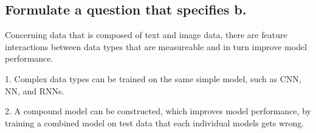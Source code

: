 \subsection{Formulate a question that specifies b.}


Concerning data that is composed of text and image data, there are feature interactions between data types that are measureable and in turn improve model performance.

1. Complex data types can be trained on the same simple model, such as CNN, NN, and RNNs.

2. A compound model can be constructed, which improves model performance, by training a combined model on test data that each individual models gets wrong.










